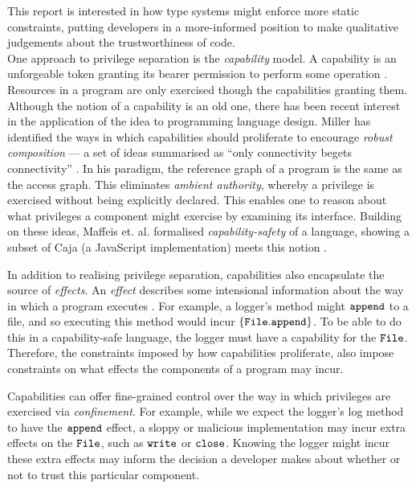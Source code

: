 This report is interested in how type systems might enforce more static constraints, putting developers in a more-informed position to make qualitative judgements about the trustworthiness of code.\\

One approach to privilege separation is the \textit{capability} model. A capability is an unforgeable token granting its bearer permission to perform some operation \cite{dennis66}. Resources in a program are only exercised though the capabilities granting them. Although the notion of a capability is an old one, there has been recent interest in the application of the idea to programming language design. Miller has identified the ways in which capabilities should proliferate to encourage \textit{robust composition} --- a set of ideas summarised as ``only connectivity begets connectivity'' \cite{miller06}. In his paradigm, the reference graph of a program is the same as the access graph. This eliminates \textit{ambient authority}, whereby a privilege is exercised without being explicitly declared. This enables one to reason about what privileges a component might exercise by examining its interface. Building on these ideas, Maffeis et. al. formalised \textit{capability-safety} of a language, showing a subset of Caja (a JavaScript implementation) meets this notion \cite{maffeis10}.

In addition to realising privilege separation, capabilities also encapsulate the source of \textit{effects}. An \textit{effect} describes some intensional information about the way in which a program executes \cite{nielson99}. For example, a logger's method might $\mathtt{append}$ to a file, and so executing this method would incur $\{ \mathtt{File.append} \}$. To be able to do this in a capability-safe language, the logger must have a capability for the $\mathtt{File}$. Therefore, the constraints imposed by how capabilities proliferate, also impose constraints on what effects the components of a program may incur.

Capabilities can offer fine-grained control over the way in which privileges are exercised via \textit{confinement}. For example, while we expect the logger's log method to have the $\mathtt{append}$ effect, a sloppy or malicious implementation may incur extra effects on the $\mathtt{File}$, such as $\mathtt{write}$ or $\mathtt{close}$. Knowing the logger might incur these extra effects may inform the decision a developer makes about whether or not to trust this particular component.

